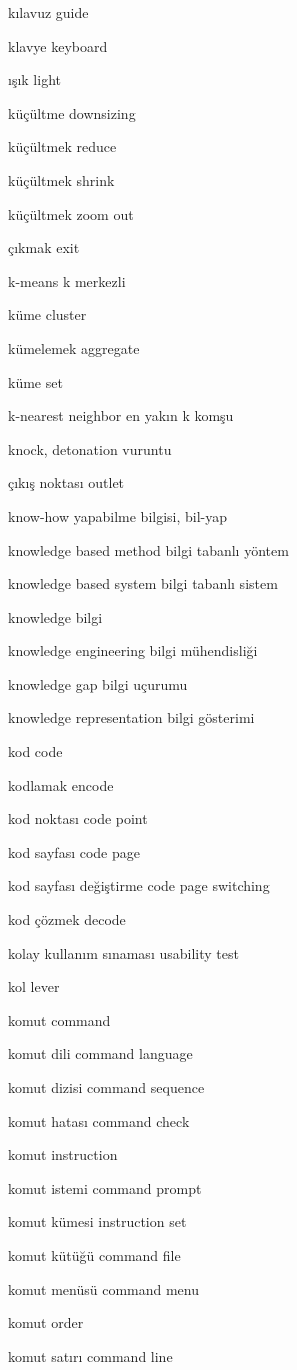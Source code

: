 \documentclass[12pt,fleqn]{article}\usepackage{../../common}
\begin{document}
kılavuz guide

klavye keyboard

ışık light

küçültme downsizing

küçültmek reduce

küçültmek shrink

küçültmek zoom out

çıkmak exit

k-means k merkezli

küme cluster

kümelemek aggregate

küme set

k-nearest neighbor en yakın k komşu

knock, detonation vuruntu

çıkış noktası outlet

know-how yapabilme bilgisi, bil-yap

knowledge based method bilgi tabanlı yöntem

knowledge based system bilgi tabanlı sistem

knowledge bilgi

knowledge engineering bilgi mühendisliği

knowledge gap bilgi uçurumu

knowledge representation bilgi gösterimi

kod code

kodlamak encode

kod noktası code point

kod sayfası code page

kod sayfası değiştirme code page switching

kod çözmek decode

kolay kullanım sınaması usability test

kol lever

komut command

komut dili command language

komut dizisi command sequence

komut hatası command check

komut instruction

komut istemi command prompt

komut kümesi instruction set

komut kütüğü command file

komut menüsü command menu

komut order

komut satırı command line
\end{document}
